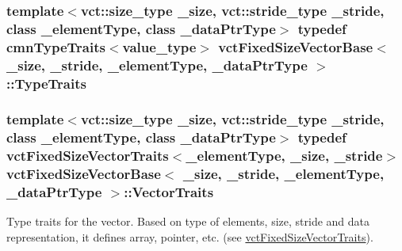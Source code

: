 \hypertarget{classvct_fixed_size_vector_base_ad6d90437534a054c5beb020f588b0b02}{
\subsubsection[{Type\-Traits}]{\setlength{\rightskip}{0pt plus 5cm}template$<$vct\-::size\-\_\-type \-\_\-size, vct\-::stride\-\_\-type \-\_\-stride, class \-\_\-element\-Type, class \-\_\-data\-Ptr\-Type$>$ typedef {\bf cmn\-Type\-Traits}$<$value\-\_\-type$>$ {\bf vct\-Fixed\-Size\-Vector\-Base}$<$ \-\_\-size, \-\_\-stride, \-\_\-element\-Type, \-\_\-data\-Ptr\-Type $>$\-::{\bf Type\-Traits}}}\label{classvct_fixed_size_vector_base_ad6d90437534a054c5beb020f588b0b02}
\hypertarget{classvct_fixed_size_vector_base_adacd2ddaf3408250dbcfc8fe5fecfd32}{
\subsubsection[{Vector\-Traits}]{\setlength{\rightskip}{0pt plus 5cm}template$<$vct\-::size\-\_\-type \-\_\-size, vct\-::stride\-\_\-type \-\_\-stride, class \-\_\-element\-Type, class \-\_\-data\-Ptr\-Type$>$ typedef {\bf vct\-Fixed\-Size\-Vector\-Traits}$<$\-\_\-element\-Type, \-\_\-size, \-\_\-stride$>$ {\bf vct\-Fixed\-Size\-Vector\-Base}$<$ \-\_\-size, \-\_\-stride, \-\_\-element\-Type, \-\_\-data\-Ptr\-Type $>$\-::{\bf Vector\-Traits}}}\label{classvct_fixed_size_vector_base_adacd2ddaf3408250dbcfc8fe5fecfd32}
Type traits for the vector. Based on type of elements, size, stride and data representation, it defines array, pointer, etc. (see \hyperlink{classvct_fixed_size_vector_traits}{vct\-Fixed\-Size\-Vector\-Traits}). 

